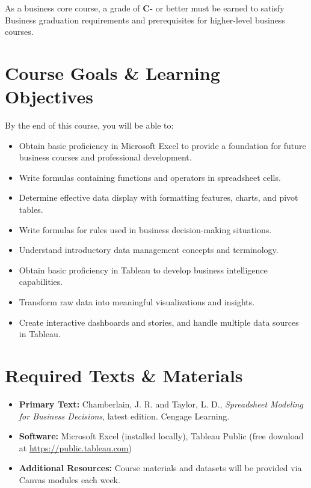 \documentclass[11pt,a4paper]{article}
\begin{document}
As a business core course, a grade of \textbf{C-} or better must be earned to satisfy Business graduation requirements and prerequisites for higher-level business courses.

\section*{Course Goals \& Learning Objectives}
By the end of this course, you will be able to:
\begin{itemize}
    \item Obtain basic proficiency in Microsoft Excel to provide a foundation for future business courses and professional development.
    \item Write formulas containing functions and operators in spreadsheet cells.
    \item Determine effective data display with formatting features, charts, and pivot tables.
    \item Write formulas for rules used in business decision-making situations.
    \item Understand introductory data management concepts and terminology.
    \item Obtain basic proficiency in Tableau to develop business intelligence capabilities.
    \item Transform raw data into meaningful visualizations and insights.
    \item Create interactive dashboards and stories, and handle multiple data sources in Tableau.
\end{itemize}

\section*{Required Texts \& Materials}
\begin{itemize}[leftmargin=*]
    \item \textbf{Primary Text:} Chamberlain, J. R. and Taylor, L. D., \textit{Spreadsheet Modeling for Business Decisions}, latest edition. Cengage Learning.
    \item \textbf{Software:} Microsoft Excel (installed locally), Tableau Public (free download at \url{https://public.tableau.com})
    \item \textbf{Additional Resources:} Course materials and datasets will be provided via Canvas modules each week.
\end{itemize}
\end{document}
